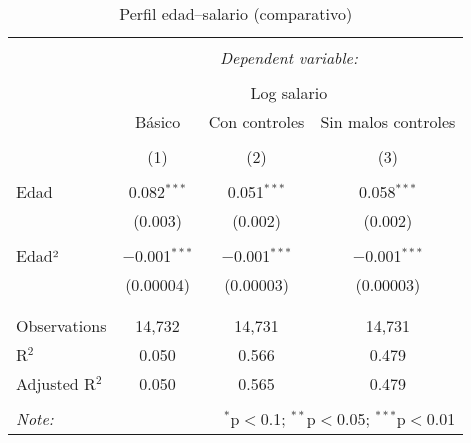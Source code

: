 
\begin{table}[!htbp] \centering 
  \caption{Perfil edad–salario (comparativo)} 
  \label{} 
\begin{tabular}{@{\extracolsep{5pt}}lccc} 
\\[-1.8ex]\hline 
\hline \\[-1.8ex] 
 & \multicolumn{3}{c}{\textit{Dependent variable:}} \\ 
\cline{2-4} 
\\[-1.8ex] & \multicolumn{3}{c}{Log salario} \\ 
 & Básico & Con controles & Sin malos controles \\ 
\\[-1.8ex] & (1) & (2) & (3)\\ 
\hline \\[-1.8ex] 
 Edad & 0.082$^{***}$ & 0.051$^{***}$ & 0.058$^{***}$ \\ 
  & (0.003) & (0.002) & (0.002) \\ 
  & & & \\ 
 Edad² & $-$0.001$^{***}$ & $-$0.001$^{***}$ & $-$0.001$^{***}$ \\ 
  & (0.00004) & (0.00003) & (0.00003) \\ 
  & & & \\ 
\hline \\[-1.8ex] 
Observations & 14,732 & 14,731 & 14,731 \\ 
R$^{2}$ & 0.050 & 0.566 & 0.479 \\ 
Adjusted R$^{2}$ & 0.050 & 0.565 & 0.479 \\ 
\hline 
\hline \\[-1.8ex] 
\textit{Note:}  & \multicolumn{3}{r}{$^{*}$p$<$0.1; $^{**}$p$<$0.05; $^{***}$p$<$0.01} \\ 
\end{tabular} 
\end{table} 
